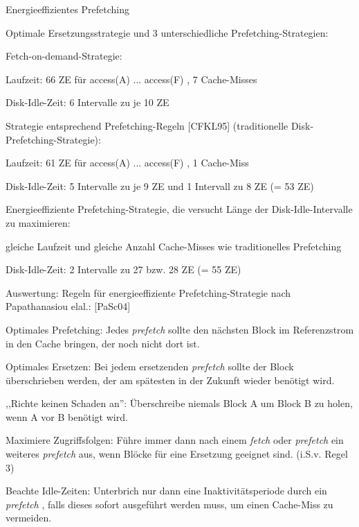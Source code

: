 \documentclass[a4paper]{article}
\begin{document}
\begin{multicols}{3}
\begin{itemize*}
\begin{itemize*}
        \end{itemize*}
        \item
        Energieeffizientes Prefetching
        \begin{itemize*}
            \item Optimale Ersetzungsstrategie und 3 unterschiedliche Prefetching-Strategien:
            \item Fetch-on-demand-Strategie: \begin{itemize*} \item Laufzeit: 66 ZE für access(A) ... access(F) , 7 Cache-Misses \item Disk-Idle-Zeit: 6 Intervalle zu je 10 ZE \end{itemize*}
            \item Strategie entsprechend Prefetching-Regeln {[}CFKL95{]} (traditionelle Disk-Prefetching-Strategie): \begin{itemize*} \item Laufzeit: 61 ZE für access(A) ... access(F) , 1 Cache-Miss \item Disk-Idle-Zeit: 5 Intervalle zu je 9 ZE und 1 Intervall zu 8 ZE (= 53 ZE) \end{itemize*}
            \item Energieeffiziente Prefetching-Strategie, die versucht Länge der Disk-Idle-Intervalle zu maximieren: \begin{itemize*} \item gleiche Laufzeit und gleiche Anzahl Cache-Misses wie traditionelles Prefetching \item Disk-Idle-Zeit: 2 Intervalle zu 27 bzw. 28 ZE (= 55 ZE) \end{itemize*}
        \end{itemize*}
        \item
        Auswertung: Regeln für energieeffiziente Prefetching-Strategie nach
        Papathanasiou elal.: {[}PaSc04{]}
        \begin{enumerate*}

            \item Optimales Prefetching: Jedes \emph{prefetch} sollte den nächsten Block im Referenzstrom in den Cache bringen, der noch nicht dort ist.
            \item Optimales Ersetzen: Bei jedem ersetzenden \emph{prefetch} sollte der Block überschrieben werden, der am spätesten in der Zukunft wieder benötigt wird.
            \item ,,Richte keinen Schaden an'': Überschreibe niemals Block A um Block B zu holen, wenn A vor B benötigt wird.
            \item Maximiere Zugriffsfolgen: Führe immer dann nach einem \emph{fetch} oder \emph{prefetch} ein weiteres \emph{prefetch} aus, wenn Blöcke für eine Ersetzung geeignet sind. (i.S.v. Regel 3)
            \item Beachte Idle-Zeiten: Unterbrich nur dann eine Inaktivitätsperiode durch ein \emph{prefetch} , falls dieses sofort ausgeführt werden muss, um einen Cache-Miss zu vermeiden.
        \end{enumerate*}
    \end{itemize*}


\end{multicols}
\end{document}
